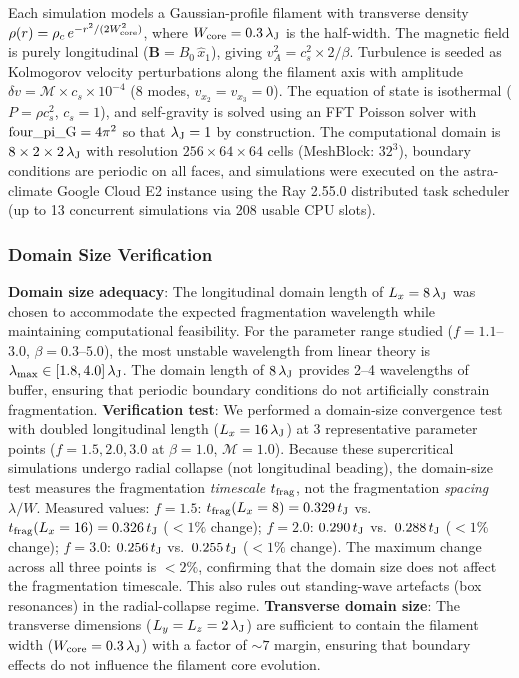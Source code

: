 \documentclass[twoside,twocolumn]{mnras}
\begin{document}
Each simulation models a Gaussian-profile filament with transverse density $\rho(r) = \rho_c\,e^{-r^2/(2W_{\rm core}^2)}$, where $W_{\rm core} = 0.3\,\lambda_{\rm J}$ is the half-width. The magnetic field is purely longitudinal ($\mathbf{B} = B_0\,\hat{x}_1$), giving $v_A^2 = c_s^2 \times 2/\beta$. Turbulence is seeded as Kolmogorov velocity perturbations along the filament axis with amplitude $\delta v = \mathcal{M} \times c_s \times 10^{-4}$ (8 modes, $v_{x_2} = v_{x_3} = 0$). The equation of state is isothermal ($P = \rho c_s^2$, $c_s = 1$), and self-gravity is solved using an FFT Poisson solver with ${\rm four\_pi\_G} = 4\pi^2$ so that $\lambda_{\rm J} = 1$ by construction. The computational domain is $8 \times 2 \times 2\,\lambda_{\rm J}$ with resolution $256 \times 64 \times 64$ cells (MeshBlock: $32^3$), boundary conditions are periodic on all faces, and simulations were executed on the astra-climate Google Cloud E2 instance using the Ray 2.55.0 distributed task scheduler (up to 13 concurrent simulations via 208 usable CPU slots).

\subsubsection{Domain Size Verification}

\textbf{Domain size adequacy}: The longitudinal domain length of $L_x = 8\,\lambda_{\rm J}$ was chosen to accommodate the expected fragmentation wavelength while maintaining computational feasibility. For the parameter range studied ($f = 1.1$--$3.0$, $\beta = 0.3$--$5.0$), the most unstable wavelength from linear theory is $\lambda_{\rm max} \in [1.8, 4.0]\,\lambda_{\rm J}$. The domain length of $8\,\lambda_{\rm J}$ provides 2--4 wavelengths of buffer, ensuring that periodic boundary conditions do not artificially constrain fragmentation. \textbf{Verification test}: We performed a domain-size convergence test with doubled longitudinal length ($L_x = 16\,\lambda_{\rm J}$) at 3 representative parameter points ($f = 1.5, 2.0, 3.0$ at $\beta = 1.0$, $\mathcal{M} = 1.0$). Because these supercritical simulations undergo radial collapse (not longitudinal beading), the domain-size test measures the fragmentation \textit{timescale} $t_{\rm frag}$, not the fragmentation \textit{spacing} $\lambda/W$. Measured values: $f = 1.5$: $t_{\rm frag}(L_x = 8) = 0.329\,t_{\rm J}$ vs.\ $t_{\rm frag}(L_x = 16) = 0.326\,t_{\rm J}$ ($<1\%$ change); $f = 2.0$: $0.290\,t_{\rm J}$ vs.\ $0.288\,t_{\rm J}$ ($<1\%$ change); $f = 3.0$: $0.256\,t_{\rm J}$ vs.\ $0.255\,t_{\rm J}$ ($<1\%$ change). The maximum change across all three points is $<2\%$, confirming that the domain size does not affect the fragmentation timescale. This also rules out standing-wave artefacts (box resonances) in the radial-collapse regime. \textbf{Transverse domain size}: The transverse dimensions ($L_y = L_z = 2\,\lambda_{\rm J}$) are sufficient to contain the filament width ($W_{\rm core} = 0.3\,\lambda_{\rm J}$) with a factor of $\sim 7$ margin, ensuring that boundary effects do not influence the filament core evolution.
\end{document}
